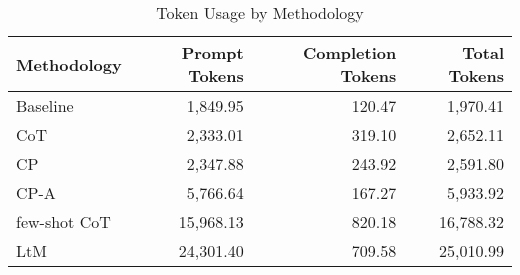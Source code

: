 \begin{table}
\caption{Token Usage by Methodology}
\label{tab:token-usage}
\begin{tabular}{lrrr}
\toprule
Methodology & Prompt Tokens & Completion Tokens & Total Tokens \\
\midrule
Baseline & 1,849.95 & 120.47 & 1,970.41 \\
CoT & 2,333.01 & 319.10 & 2,652.11 \\
CP & 2,347.88 & 243.92 & 2,591.80 \\
CP-A & 5,766.64 & 167.27 & 5,933.92 \\
few-shot CoT & 15,968.13 & 820.18 & 16,788.32 \\
LtM & 24,301.40 & 709.58 & 25,010.99 \\
\bottomrule
\end{tabular}
\end{table}
